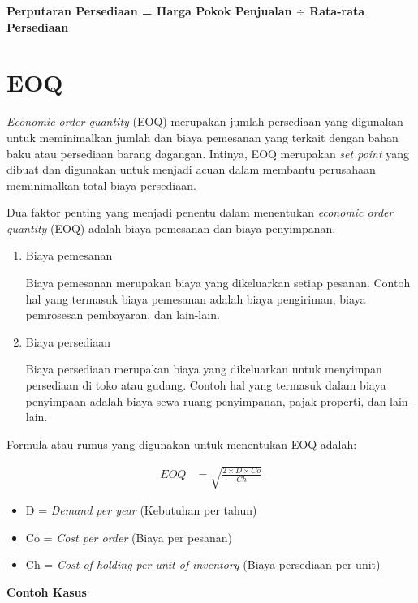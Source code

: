 \textbf{Perputaran Persediaan = Harga Pokok Penjualan $\div$ Rata-rata Persediaan}

\section{EOQ}

\textit{Economic order quantity} (EOQ) merupakan jumlah persediaan yang digunakan untuk meminimalkan jumlah dan biaya pemesanan yang terkait dengan bahan baku atau persediaan barang dagangan. Intinya, EOQ merupakan \textit{set point} yang dibuat dan digunakan untuk menjadi acuan dalam membantu perusahaan meminimalkan total biaya persediaan.

Dua faktor penting yang menjadi penentu dalam menentukan \textit{economic order quantity} (EOQ) adalah biaya pemesanan dan biaya penyimpanan.

\begin{enumerate}
	\item Biaya pemesanan
	
	Biaya pemesanan merupakan biaya yang dikeluarkan setiap pesanan. Contoh hal yang termasuk biaya pemesanan adalah biaya pengiriman, biaya pemrosesan pembayaran, dan lain-lain.

	\item Biaya persediaan
	
	Biaya persediaan merupakan biaya yang dikeluarkan untuk menyimpan persediaan di toko atau gudang. Contoh hal yang termasuk dalam biaya penyimpaan adalah biaya sewa ruang penyimpanan, pajak properti, dan lain-lain.
\end{enumerate}

Formula atau rumus yang digunakan untuk menentukan EOQ adalah:

\begin{equation}
    \begin{split}
		EOQ
		&= \sqrt{\frac{2 \times D \times Co}{Ch}}
    \end{split}
\end{equation}

\begin{itemize}
	\item D = \textit{Demand per year} (Kebutuhan per tahun)
	\item Co = \textit{Cost per order} (Biaya per pesanan)
	\item Ch = \textit{Cost of holding per unit of inventory} (Biaya persediaan per unit)
\end{itemize}

\textbf{Contoh Kasus}

